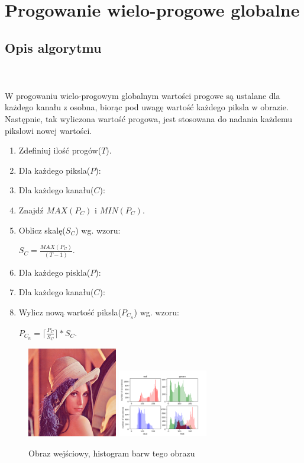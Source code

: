 \documentclass[final,a4paper,openany,12pt]{mwbk}
\begin{document}
\newpage




\section{Progowanie wielo-progowe globalne}
\subsection*{Opis algorytmu}
\hfill
\\\\
\indent W progowaniu wielo-progowym globalnym wartości progowe są ustalane dla każdego kanału z osobna, biorąc pod uwagę wartość każdego piksla w obrazie. Następnie, tak wyliczona wartość progowa, jest stosowana do nadania każdemu pikslowi nowej wartości.

\begin{enumerate}
	\item Zdefiniuj ilość progów($T$).
	\item Dla każdego piksla($P$):
	\item Dla każdego kanału($C$):
	\item Znajdź $MAX(P_C)$ i $MIN(P_C)$.
	\item Oblicz skalę($S_C$) wg. wzoru:\\
	\centerline{$S_C = \frac{MAX(P_C)}{(T - 1)}$.}
	\item Dla każdego piskla($P$):
	\item Dla każdego kanału($C$):
	\item Wylicz nową wartość piksla($P_{C_{n}}$) wg. wzoru:\\
	\centerline{$P_{C_{n}} = \lceil \frac{P_C}{S_C} \rceil * S_C $.}
\end{enumerate}




\begin{figure}[H]
	\begin{center}
		\includegraphics[width=0.35\textwidth]{lena_color}
		\includegraphics[width=0.35\textwidth]{lena_color_histogram}
	\end{center}
	\caption{Obraz wejściowy, histogram barw tego obrazu}
\end{figure}
\end{document}

